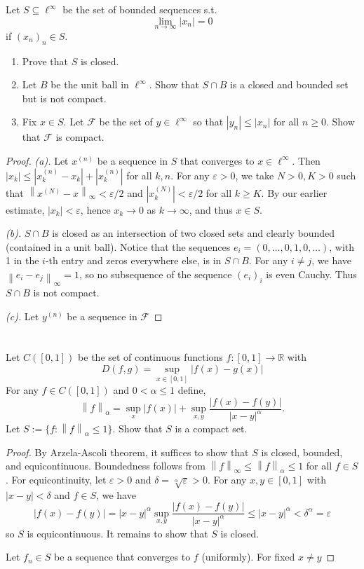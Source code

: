 \documentclass{article}
\newcommand{\R}{\mathbb{R}}
\newcommand{\norm}[1]{\left\|#1\right\|}
\newcommand{\supnorm}[1]{\left\|#1\right\|_{\infty}}
\theoremstyle{definition} %
\numberwithin{thm}{section} %
\theoremstyle{definition} %
\begin{document}
Let $S \subseteq \ell^\infty$ be the set of bounded sequences s.t.
\[
    \lim_{n \to \infty} |x_n| = 0
\]
if $(x_n)_n \in S$.
\begin{enumerate}[label=(\alph*)]
    \item Prove that $S$ is closed.
    \item Let $B$ be the unit ball in $\ell^\infty$. Show that 
    $S \cap B$ is a closed and bounded set but is not compact.
    \item Fix $x \in S$. Let $\mathcal{F}$ be the set of 
    $y \in \ell^\infty$ so that $|y_n| \leq |x_n|$ for all $n \geq 0$. 
    Show that $\mathcal{F}$ is compact.
\end{enumerate}
\begin{proof}
\textit{(a).}
Let $x^{(n)}$ be a sequence in $S$ that converges to $x \in \ell^\infty$.
Then $|x_k| \leq |x^{(n)}_k - x_k| + |x^{(n)}_k|$ for all $k, n$.
For any $\varepsilon > 0$, we take $N > 0, K > 0$ such that 
$\supnorm{x^{(N)} - x} < \varepsilon/2$ and $|x^{(N)}_k| < \varepsilon/2$
for all $k \geq K$. By our earlier estimate, $|x_k| < \varepsilon$,
hence $x_k \to 0$ as $k \to \infty$, and thus $x \in S$.

\textit{(b).}
$S \cap B$ is closed as an intersection of two closed sets and 
clearly bounded (contained in a unit ball). Notice that the sequences
$e_i = (0, \dots, 0, 1, 0, \dots)$, with 1 in the $i$-th entry and zeros
everywhere else, is in $S \cap B$. For any $i \neq j$, we have 
$\supnorm{e_i - e_j} = 1$, so no subsequence of the sequence $(e_i)_i$
is even Cauchy. Thus $S \cap B$ is not compact.

\textit{(c).}
Let $y^{(n)}$ be a sequence in $\mathcal{F}$
\end{proof}

\section{}

Let $C([0, 1])$ be the set of continuous functions $f: [0, 1] \to \R$ with
\[
    D(f, g) = \sup_{x \in [0, 1]}|f(x) - g(x)|  
\]
For any $f \in C([0, 1])$ and $0 < \alpha \leq 1$ define,
\[
    \norm{f}_\alpha = \sup_x|f(x)| + 
    \sup_{x, y}\frac{|f(x) - f(y)|}{|x - y|^\alpha}.
\]
Let $S := \{f : \norm{f}_\alpha \leq 1\}$. Show that $S$ is a compact set.
\begin{proof}
By Arzela-Ascoli theorem, it suffices to show that $S$ is closed, bounded,
and equicontinuous. Boundedness follows from $\supnorm{f} \leq 
\norm{f}_\alpha \leq 1$ for all $f \in S$. For equicontinuity, let
$\varepsilon > 0$ and $\delta = \sqrt[\alpha]{\varepsilon} > 0$.
For any $x, y \in [0, 1]$ with $|x - y| < \delta$ and $f \in S$, we have
\[
    |f(x) - f(y)| = |x - y|^\alpha 
    \sup_{x, y}\frac{|f(x) - f(y)|}{|x - y|^\alpha} 
    \leq |x - y|^\alpha < \delta^\alpha = \varepsilon
\]
so $S$ is equicontinuous. It remains to show that $S$ is closed.

Let $f_n \in S$ be a sequence that converges to $f$ (uniformly). For fixed
$x \neq y$
\end{proof}
\end{document}
